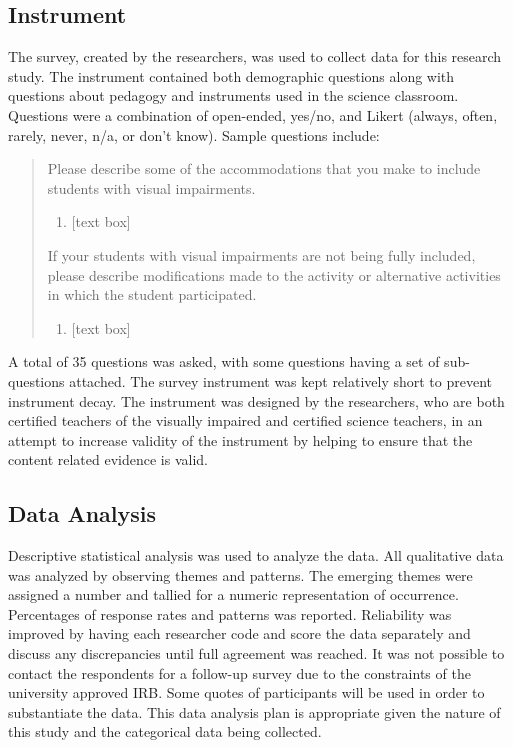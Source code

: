 \documentclass[11.5pt]{sig-alternate} %
\begin{document}
\begin{large}
\subsection*{Instrument}

The survey, created by the researchers, was used to collect data for this research study.  The instrument contained both demographic questions along with questions about pedagogy and instruments used in the science classroom. Questions were a combination of open-ended, yes/no, and Likert (always, often, rarely, never, n/a, or don’t know).  Sample questions include:  

\begin{quote}
Please describe some of the accommodations that you make to include students with visual impairments.
\begin{enumerate}[label=\alph*.]
    \item {[text box]}
\end{enumerate}
If your students with visual impairments are not being fully included, please describe modifications made to the activity or alternative activities in which the student participated.
\begin{enumerate}[label=\alph*., resume]
    \item {[text box]}
\end{enumerate}
\end{quote}

A total of 35 questions was asked, with some questions having a set of sub-questions attached.  The survey instrument was kept relatively short to prevent instrument decay. The instrument was designed by the researchers, who are both certified teachers of the visually impaired and certified science teachers, in an attempt to increase validity of the instrument by helping to ensure that the content related evidence is valid.

\subsection*{Data Analysis}

Descriptive statistical analysis was used to analyze the data.  All qualitative data was analyzed by observing themes and patterns.  The emerging themes were assigned a number and tallied for a numeric representation of occurrence.  Percentages of response rates and patterns was reported.  Reliability was improved by having each researcher code and score the data separately and discuss any discrepancies until full agreement was reached.  It was not possible to contact the respondents for a follow-up survey due to the constraints of the university approved IRB.  Some quotes of participants will be used in order to substantiate the data.  This data analysis plan is appropriate given the nature of this study and the categorical data being collected.  


\end{large}
\end{document}
